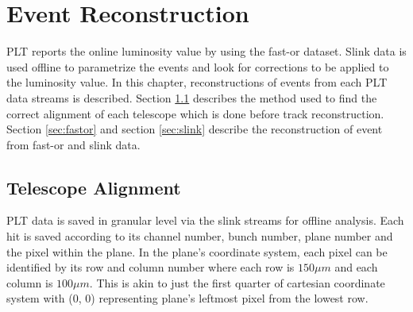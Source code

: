 
\chapter{Event Reconstruction} \label{ch:reconstruction}


PLT reports the online luminosity value by using the fast-or dataset. Slink data is used offline to parametrize the events and look for corrections to be applied to the luminosity value. In this chapter, reconstructions of events from each PLT data streams is described. Section \ref{sec:telAlign} describes the method used to find the correct alignment of each telescope which is done before track reconstruction. Section \ref{sec:fastor} and section \ref{sec:slink} describe the reconstruction of event from fast-or and slink data.



\section{Telescope Alignment} \label{sec:telAlign}



PLT data is saved in granular level via the slink streams for offline analysis. Each hit is saved according to its channel number, bunch number, plane number and the pixel within the plane. In the plane's coordinate system, each pixel can be identified by its row and column number where each row is $150 \mu m$ and each column is $100 \mu m$. This is akin to just the first quarter of cartesian coordinate system with (0, 0) representing plane's leftmost pixel from the lowest row. 



